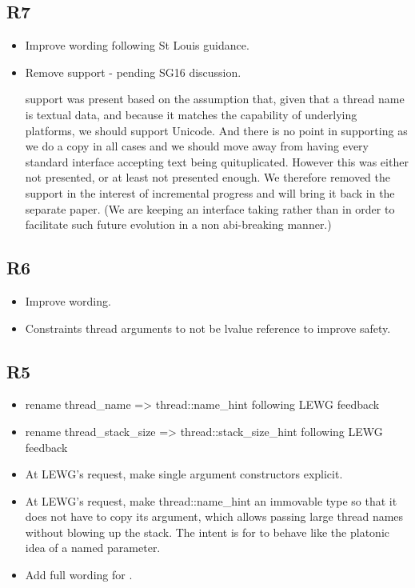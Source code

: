 \documentclass{wg21}
\begin{document}
\subsection{R7}
\begin{itemize}
\item Improve wording following St Louis guidance.
\item Remove  support - pending SG16 discussion.

 support was present based on the assumption that, given that
a thread name is textual data, and because it matches the capability of underlying platforms,
we should support Unicode. And there is no point in supporting  as
we do a copy in all cases and we should move away from having every standard interface accepting text
being quituplicated.
However this was either not presented, or at least not presented enough.
We therefore removed the support in the interest of incremental progress and will bring it back in the separate paper.
(We are keeping an interface taking  rather than  in order to facilitate such future evolution in a non abi-breaking manner.)

\end{itemize}
\subsection{R6}

\begin{itemize}
\item Improve wording.
\item Constraints thread arguments to not be lvalue reference to improve safety.
\end{itemize}

\subsection{R5}

\begin{itemize}
\item rename thread_name => thread::name_hint following LEWG feedback
\item rename thread_stack_size => thread::stack_size_hint following LEWG feedback
\item At LEWG's request, make single argument constructors explicit.
\item At LEWG's request, make thread::name_hint an immovable type so that it does not have to copy its argument, which allows passing large thread names without blowing up the stack.
      The intent is for  to behave like the platonic idea of a named parameter.
\item Add full wording for .
\end{itemize}
\end{document}
